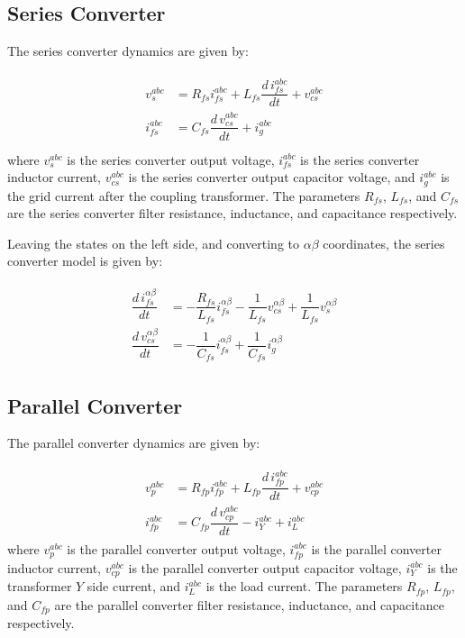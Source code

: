 \subsection{Series Converter}

The series converter dynamics are given by:

\begin{align}
    \begin{aligned}
        v_s^{abc} &= R_{fs}i_{fs}^{abc} + L_{fs}\dfrac{d\,i_{fs}^{abc}}{dt} + v_{cs}^{abc} \\
        i_{fs}^{abc} &= C_{fs}\dfrac{d\,v_{cs}^{abc}}{dt} + i_g^{abc} \\
    \end{aligned}
\end{align}
where $v_s^{abc}$ is the series converter output voltage, $i_{fs}^{abc}$ is the series converter inductor current, $v_{cs}^{abc}$ is the series converter output capacitor voltage, and $i_g^{abc}$ is the grid current after the coupling transformer. The parameters $R_{fs}$, $L_{fs}$, and $C_{fs}$ are the series converter filter resistance, inductance, and capacitance respectively.

Leaving the states on the left side, and converting to $\alpha\beta$ coordinates, the series converter model is given by:

\begin{align}
    \begin{aligned}
        \dfrac{d\,i_{fs}^{\alpha\beta}}{dt} &= -\dfrac{R_{fs}}{L_{fs}}i_{fs}^{\alpha\beta} - \dfrac{1}{L_{fs}}v_{cs}^{\alpha\beta} + \dfrac{1}{L_{fs}}v_s^{\alpha\beta} \\
        \dfrac{d\,v_{cs}^{\alpha\beta}}{dt} &= -\dfrac{1}{C_{fs}}i_{fs}^{\alpha\beta} + \dfrac{1}{C_{fs}}i_g^{\alpha\beta}
    \end{aligned}
\end{align}

\subsection{Parallel Converter}

The parallel converter dynamics are given by:

\begin{align}
    \begin{aligned}
        v_p^{abc} &= R_{fp}i_{fp}^{abc} + L_{fp}\dfrac{d\,i_{fp}^{abc}}{dt} + v_{cp}^{abc} \\
        i_{fp}^{abc} &= C_{fp}\dfrac{d\,v_{cp}^{abc}}{dt} - i_Y^{abc} + i_L^{abc}
    \end{aligned}
\end{align}
where $v_p^{abc}$ is the parallel converter output voltage, $i_{fp}^{abc}$ is the parallel converter inductor current, $v_{cp}^{abc}$ is the parallel converter output capacitor voltage, $i_Y^{abc}$ is the transformer $Y$ side current, and $i_L^{abc}$ is the load current. The parameters $R_{fp}$, $L_{fp}$, and $C_{fp}$ are the parallel converter filter resistance, inductance, and capacitance respectively.

